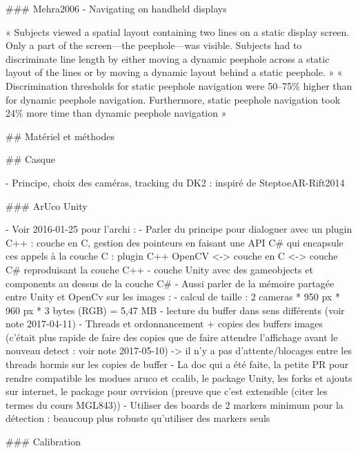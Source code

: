 ### Mehra2006 - Navigating on handheld displays

« Subjects viewed a spatial layout containing two lines on a static display screen. Only a part of the screen—the peephole—was visible. Subjects had to discriminate line length by either moving a dynamic peephole across a static layout of the lines or by moving a dynamic layout behind a static peephole. »
« Discrimination thresholds for static peephole navigation were 50–75\% higher than for dynamic peephole navigation. Furthermore, static peephole navigation took 24\% more time than dynamic peephole navigation »

## Matériel et méthodes

## Casque

- Principe, choix des caméras, tracking du DK2 : inspiré de SteptoeAR-Rift2014

### ArUco Unity

- Voir 2016-01-25 pour l'archi :
    - Parler du principe pour dialoguer avec un plugin C++ : couche en C, gestion des pointeurs en faisant une API C# qui encapsule ces appels à la couche C : plugin C++ OpenCV <-> couche en C <-> couche C# reproduisant la couche C++ 
    - couche Unity avec des gameobjects et components au dessus de la couche C#
- Aussi parler de la mémoire partagée entre Unity et OpenCv sur les images :
    - calcul de taille : 2 cameras * 950 px * 960 px * 3 bytes (RGB) = 5,47 MB
    - lecture du buffer dans sens différents (voir note 2017-04-11)
    - Threads et ordonnancement + copies des buffers images (c'était plus rapide de faire des copies que de faire attendre l'affichage avant le nouveau detect : voir note 2017-05-10) -> il n'y a pas d'attente/blocages entre les threads hormis sur les copies de buffer
- La doc qui a été faite, la petite PR pour rendre compatible les modues aruco et ccalib, le package Unity, les forks et ajouts sur internet, le package pour ovrvision (preuve que c'est extensible (citer les termes du cours MGL843))
- Utiliser des boards de 2 markers minimum pour la détection : beaucoup plus robuste qu'utiliser des markers seuls

### Calibration

